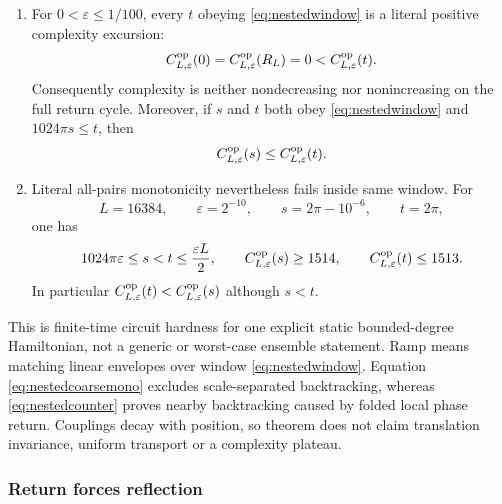 \begin{theorem}
\begin{enumerate}[leftmargin=1.7em]
\begin{equation}
 \le C^{\rm op}_{L,\varepsilon}(t)
 \le2\left\lceil\frac{2t}{\varepsilon}\right\rceil,\label{eq:nestedramp}
\end{equation}
and same bounds hold at $R_L-t$.
\item For $0<\varepsilon\le1/100$, every $t$ obeying
\eqref{eq:nestedwindow} is a literal positive complexity excursion:
\begin{equation}
 C^{\rm op}_{L,\varepsilon}(0)
 =C^{\rm op}_{L,\varepsilon}(R_L)=0
 <C^{\rm op}_{L,\varepsilon}(t).                  \label{eq:nestedexcursion}
\end{equation}
Consequently complexity is neither nondecreasing nor nonincreasing on the
full return cycle.  Moreover, if $s$ and $t$ both obey
\eqref{eq:nestedwindow} and $1024\pi s\le t$, then
\begin{equation}
 C^{\rm op}_{L,\varepsilon}(s)
 \le C^{\rm op}_{L,\varepsilon}(t).                \label{eq:nestedcoarsemono}
\end{equation}
\item Literal all-pairs monotonicity nevertheless fails inside same window.
For
\begin{equation}
 L=16384,\qquad \varepsilon=2^{-10},\qquad
 s=2\pi-10^{-6},\qquad t=2\pi,                    \label{eq:nestedcountertimes}
\end{equation}
one has
\begin{equation}
 1024\pi\varepsilon\le s<t\le\frac{\varepsilon L}{2},
 \qquad
 C^{\rm op}_{L,\varepsilon}(s)\ge1514,
 \qquad
 C^{\rm op}_{L,\varepsilon}(t)\le1513.            \label{eq:nestedcounter}
\end{equation}
In particular $C^{\rm op}_{L,\varepsilon}(t)<
C^{\rm op}_{L,\varepsilon}(s)$ although $s<t$.
\end{enumerate}
\end{theorem}

This is finite-time circuit hardness for one explicit static bounded-degree
Hamiltonian, not a generic or worst-case ensemble statement.  Ramp means
matching linear envelopes over window \eqref{eq:nestedwindow}.  Equation
\eqref{eq:nestedcoarsemono} excludes scale-separated backtracking, whereas
\eqref{eq:nestedcounter} proves nearby backtracking caused by folded local
phase return.  Couplings decay with position, so theorem
does not claim translation invariance, uniform transport or a complexity
plateau.

\subsubsection{Return forces reflection}

